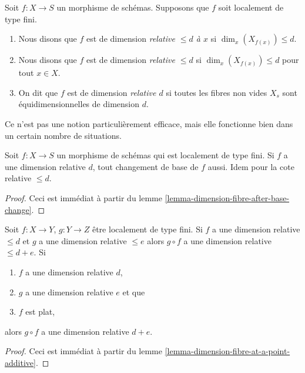 \begin{definition}
\label{definition-relative-dimension-d}
Soit $f : X \to S$ un morphisme de schémas. Supposons que
$f$ soit localement de type fini.
\begin{enumerate}
\item Nous disons que $f$ est de dimension {\it relative $\leq d$ à
$x$} si $\dim_x(X_{f(x)}) \leq d$.
\item Nous disons que $f$ est de dimension {\it relative
$\leq d$} si $\dim_x(X_{f(x)}) \leq d$ pour tout $x \in X$.
\item On dit que $f$ est de dimension {\it relative $d$}
si toutes les fibres non vides $X_s$ sont équidimensionnelles de dimension $d$.
\end{enumerate}
\end{definition}

\noindent
Ce n'est pas une notion particulièrement efficace, mais elle fonctionne bien dans un
certain nombre de situations.

\begin{lemma}
\label{lemma-base-change-relative-dimension-d}
Soit $f : X \to S$ un morphisme de schémas qui est localement de type fini. Si $f$
a une dimension relative $d$, tout changement de base de $f$ aussi.
Idem pour la cote relative $\leq d$.
\end{lemma}

\begin{proof}
Ceci est immédiat
à partir du lemme \ref{lemma-dimension-fibre-after-base-change}.
\end{proof}

\begin{lemma}
\label{lemma-composition-relative-dimension-d}
Soit $f : X \to Y$, $g : Y \to Z$ être localement de type fini. Si $f$
a une dimension relative $\leq d$ et $g$ a une dimension relative $\leq e$
alors $g \circ f$ a une dimension relative $\leq d + e$.
Si
\begin{enumerate}
\item $f$ a une dimension relative $d$,
\item $g$ a une dimension relative $e$ et que
\item $f$ est plat,
\end{enumerate}
alors $g \circ f$ a une dimension relative $d + e$.
\end{lemma}

\begin{proof}
Ceci est immédiat à partir du lemme \ref{lemma-dimension-fibre-at-a-point-additive}.
\end{proof}

